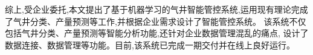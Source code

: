 综上,受企业委托,本文提出了基于机器学习的气井智能管控系统,运用现有理论完成了气井分类、产量预测等工作,并根据企业需求设计了智能管控系统。
该系统不仅包括气井分类、产量预测等智能分析功能,还针对企业数据管理混乱的痛点,
设计了数据连接、数据管理等功能。目前,该系统已完成一期交付并在线上良好运行。






